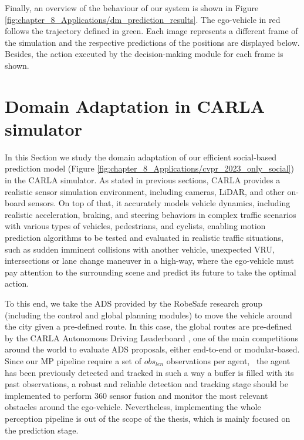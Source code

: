 Finally, an overview of the behaviour of our system is shown in Figure \ref{fig:chapter_8_Applications/dm_prediction_results}. The ego-vehicle in red follows the trajectory defined in green. Each image represents a different frame of the simulation and the respective predictions of the positions are displayed below. Besides, the action executed by the decision-making module for each frame is shown.

\section{Domain Adaptation in CARLA simulator}
\label{sec:8_domain_adaptation_carla}

In this Section we study the domain adaptation of our efficient social-based prediction model (Figure \ref{fig:chapter_8_Applications/cvpr_2023_only_social}) in the CARLA simulator. As stated in previous sections, CARLA provides a realistic sensor simulation environment, including cameras, \ac{LiDAR}, and other on-board sensors. On top of that, it accurately models vehicle dynamics, including realistic acceleration, braking, and steering behaviors in complex traffic scenarios with various types of vehicles, pedestrians, and cyclists, enabling motion prediction algorithms to be tested and evaluated in realistic traffic situations, such as sudden imminent collisions with another vehicle, unexpected \ac{VRU}, intersections or lane change maneuver in a high-way, where the ego-vehicle must pay attention to the surrounding scene and predict its future to take the optimal action. 

To this end, we take the \ac{ADS} provided by the RobeSafe research group (including the control and global planning modules) to move the vehicle around the city given a pre-defined route. In this case, the global routes are pre-defined by the CARLA Autonomous Driving Leaderboard \cite{dosovitskiy2017carla}, one of the main competitions around the world to evaluate \ac{ADS} proposals, either end-to-end or modular-based. Since our \ac{MP} pipeline require a set of \textit{$obs_{len}$} observations per agent, \ie \ the agent has been previously detected and tracked in such a way a buffer is filled with its past observations, a robust and reliable detection and tracking stage should be implemented to perform 360 \degree sensor fusion and monitor the most relevant obstacles around the ego-vehicle. Nevertheless, implementing the whole perception pipeline is out of the scope of the thesis, which is mainly focused on the prediction stage.

